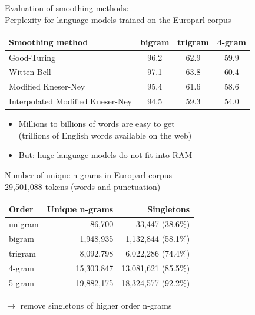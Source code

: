 \documentclass[landscape]{slides}
\begin{document}

\vspace{20mm}
\begin{center}
Evaluation of smoothing methods:\\[2mm]
 Perplexity for language models trained on the Europarl corpus\\[10mm]
\begin{tabular}{|l|c|c|c|} \hline
\bf Smoothing method & \bf bigram & \bf trigram & \bf 4-gram \\ \hline
Good-Turing & 96.2 & 62.9 & 59.9\\ \hline
Witten-Bell & 97.1 & 63.8 & 60.4 \\ \hline
Modified Kneser-Ney & 95.4 & 61.6 & 58.6\\ \hline
Interpolated Modified Kneser-Ney & 94.5 & 59.3 & 54.0 \\ \hline
\end{tabular}
\end{center}


\vspace{40mm}
\begin{itemize}
\item Millions to billions of words are easy to get\\[3mm]
(trillions of English words available on the web)
\vspace{10mm}
\item But: huge language models do not fit into RAM
\end{itemize}


\vspace{10mm}
\begin{center}
Number of unique n-grams in Europarl corpus\\[2mm]
29,501,088 tokens (words and punctuation)\\[10mm]
\begin{tabular}{|l|r|r|} \hline
\bf Order & \bf Unique n-grams & \bf Singletons \\ \hline
unigram & 86,700 & 33,447 (38.6\%)\\ \hline
bigram & 1,948,935 & 1,132,844 (58.1\%) \\ \hline
trigram & 8,092,798 & 6,022,286 (74.4\%) \\ \hline
4-gram & 15,303,847 & 13,081,621 (85.5\%)\\ \hline
5-gram & 19,882,175 & 18,324,577 (92.2\%) \\ \hline
\end{tabular}

\vspace{10mm}
$\rightarrow$ remove singletons of higher order n-grams
\end{center}
\end{document}
